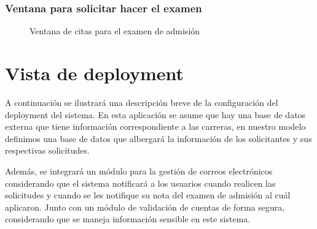 \documentclass[12pt,a4paper]{article}
\begin{document}
\subsubsection*{Ventana para solicitar hacer el examen}

\begin{figure}[H]
  \centering
  \caption{Ventana de citas para el examen de admisión}
  \label{fig:vtnExamenesUsuario}
\end{figure}

\section{Vista de deployment}

A continuación se ilustrará una descripción breve de la configuración del deployment del sistema. En esta aplicación se asume que hay una base de datos externa que tiene información correspondiente a las carreras, en nuestro modelo definimos una base de datos que albergará la información de los solicitantes y sus respectivas solicitudes.

Además, se integrará un módulo para la gestión de correos electrónicos considerando que el sistema notificará a los usuarios cuando realicen las solicitudes y cuando se les notifique su nota del examen de admisión al cuál aplicaron. Junto con un módulo de validación de cuentas de forma segura, considerando que se maneja información sensible en este sistema.
\end{document}
